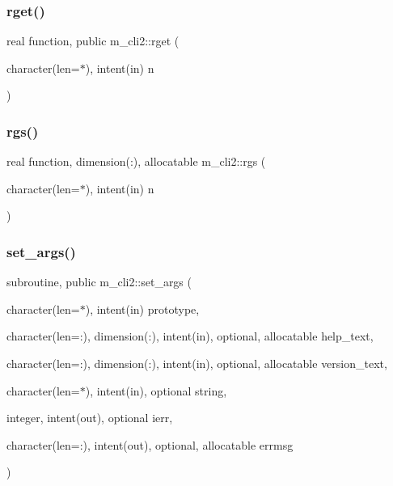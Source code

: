 \subsubsection{\texorpdfstring{rget()}{rget()}}
{\footnotesize\ttfamily real function, public m\+\_\+cli2\+::rget (\begin{DoxyParamCaption}\item[{character(len=$\ast$), intent(in)}]{n }\end{DoxyParamCaption})}

\mbox{\label{namespacem__cli2_ab526bbc0ccf60b19e298e49bf95e0595}} 
\subsubsection{\texorpdfstring{rgs()}{rgs()}}
{\footnotesize\ttfamily real function, dimension(\+:), allocatable m\+\_\+cli2\+::rgs (\begin{DoxyParamCaption}\item[{character(len=$\ast$), intent(in)}]{n }\end{DoxyParamCaption})\hspace{0.3cm}{\ttfamily [private]}}

\mbox{\label{namespacem__cli2_a54449bc83be4ddc46746a6a33b590c40}} 
\subsubsection{\texorpdfstring{set\+\_\+args()}{set\_args()}}
{\footnotesize\ttfamily subroutine, public m\+\_\+cli2\+::set\+\_\+args (\begin{DoxyParamCaption}\item[{character(len=$\ast$), intent(in)}]{prototype,  }\item[{character(len=\+:), dimension(\+:), intent(in), optional, allocatable}]{help\+\_\+text,  }\item[{character(len=\+:), dimension(\+:), intent(in), optional, allocatable}]{version\+\_\+text,  }\item[{character(len=$\ast$), intent(in), optional}]{string,  }\item[{integer, intent(out), optional}]{ierr,  }\item[{character(len=\+:), intent(out), optional, allocatable}]{errmsg }\end{DoxyParamCaption})}



